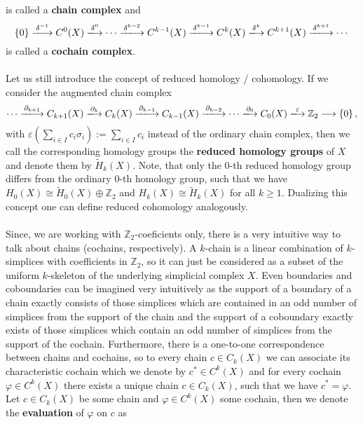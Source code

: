 is called a \textbf{chain complex} and
\[
\left\{0\right\}\xlongrightarrow{\delta^{-1}}C^0(X)\xlongrightarrow{\delta^0}\cdots\xlongrightarrow{\delta^{k-2}} C^{k-1}(X)\xlongrightarrow{\delta^{k-1}} C^k(X)\xlongrightarrow{\delta^k} C^{k+1}(X)\xlongrightarrow{\delta^{k+1}}\cdots
\]
is called a \textbf{cochain complex}.\\
\\
Let us still introduce the concept of reduced homology / cohomology. If we consider the augmented chain complex
\[
\cdots\xlongrightarrow{\partial_{k+1}} C_{k+1}(X)\xlongrightarrow{\partial_k} C_k(X)\xlongrightarrow{\partial_{k-1}} C_{k-1}(X)\xlongrightarrow{\partial_{k-2}}\cdots\xlongrightarrow{\partial_0} C_0(X)\xlongrightarrow{\varepsilon}\mathbb{Z}_2\longrightarrow \left\{0\right\},
\]
with \(\varepsilon\left(\sum\limits_{i\in I}c_i\sigma_i\right):=\sum\limits_{i\in I}c_i\) instead of the ordinary chain complex, then we call the corresponding homology groups the \textbf{reduced homology groups} of \(X\) and denote them by \(\tilde{H}_k(X)\). Note, that only the \(0\)-th reduced homology group differs from the ordinary \(0\)-th homology group, such that we have \(H_0(X)\cong\tilde{H}_0(X)\oplus\mathbb{Z}_2\) and \(H_k(X)\cong\tilde{H}_k(X)\) for all \(k\geq 1\). Dualizing this concept one can define reduced cohomology analogously.\\
\\
Since, we are working with \(\mathbb{Z}_2\)-coeficients only, there is a very intuitive way to talk about chains (cochains, respectively). A \(k\)-chain is a linear combination of \(k\)-simplices with coefficients in \(\mathbb{Z}_2\), so it can just be considered as a subset of the uniform \(k\)-skeleton of the underlying simplicial complex \(X\). Even boundaries and coboundaries can be imagined very intuitively as the support of a boundary of a chain exactly consists of those simplices which are contained in an odd number of simplices from the support of the chain and the support of a coboundary exactly exists of those simplices which contain an odd number of simplices from the support of the cochain. Furthermore, there is a one-to-one correspondence between chains and cochains, so to every chain \(c\in C_k(X)\) we can associate its characteristic cochain which we denote by \(c^*\in C^k(X)\) and for every cochain \(\varphi\in C^k(X)\) there exists a unique chain \(c\in C_k(X)\), such that we have \(c^*=\varphi\).\\
Let \(c\in C_k(X)\) be some chain and \(\varphi\in C^k(X)\) some cochain, then we denote the \textbf{evaluation} of \(\varphi\) on \(c\) as
